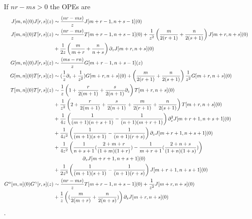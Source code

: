 \documentclass[11pt]{amsart}
\theoremstyle{thm}
\numberwithin{equation}{subsection}
\theoremstyle{def}
\theoremstyle{rem}
\begin{document}
If $nr-ms > 0$ the OPEs are
\begin{align}
J[m,n](0)J[r, s](z) &\sim {(nr-ms) \over z}J[m + r -1, n + s -1](0) \\
J[m, n](0)T[r, s](z) &\sim {(nr-ms) \over z}T[m + r -1, n + s -1](0) + {1 \over z^2}\left({m \over 2(r + 1)} + {n \over 2(s + 1)}\right)J[m + r, n + s](0) \\ \nonumber
&+{1 \over 2 z}\left({m \over m + r} + {n \over n + s} \right)\partial_z J[m + r, n + s](0)\\
G[m, n](0)J[r, s](z) &\sim {(ms - rn) \over z}G[m + r -1, n + s - 1](z) \\
G[m, n](0)T[r, s](z) &\sim ({1 \over z} \partial_z + {1 \over z^2})G[m + r, n+s](0) + \left({m \over 2(r+1)} + {n \over 2 (s + 1)}\right){1 \over z^2}G[m + r, n+s](0) \\
T[m, n](0)T[r, s](z) &\sim {1 \over z}\left(1 + {r \over 2(m+1)} + {s \over 2(n+1)}\partial_z \right) T[m + r, n +s](0) \\ \nonumber &+ {1 \over z^2}\left(2 + {r \over 2(m+1)} + {s \over 2(n+1)} + {m \over 2(r+1)} + {n \over 2(s+1)} \right)T[m + r, n + s](0)\\ \nonumber
&+{1 \over 4 z}\left({1 \over (m + 1)(n + s + 1)}- {1 \over (n +1)(m + r + 1)} \right) \partial^2_z J[m + r  +1, n + s +1](0) \\ \nonumber
&+{1 \over 4 z^2}\left({1 \over (m + 1)(s + 1)}- {1 \over (n+1)(r + s)}\right)\partial_z J[m + r + 1, n + s + 1](0) \\ \nonumber 
&+ {1 \over 4 z^2}\left({1 \over n + s + 1}({2 + m + r \over (1 + m)(1 + r)}) - {1 \over m + r + 1}({2 + n + s \over (1 + n)(1 + s)}) \right) \\ \nonumber & \ \ \ \ \ \ \ \ \ \ \ \ \ \ \ \ \ \partial_z J[m + r + 1, n + s + 1](0) \\ \nonumber
&+{1 \over 2 z^3}\left( {1 \over (m + 1)(s + 1)}- {1 \over (n+1)(r + s)}\right) J[m + r + 1, n + s + 1](0) \\ \nonumber
G^{\alpha}[m, n](0)G^{\gamma}[r, s](z) &\sim {(nr-ms) \over z}T[m + r -1, n + s -1](0) + {1 \over z^2}J[m + r, n + s](0) \\ \nonumber
&+{1 \over z}\left(({m \over 2 (m + r)} + {n \over 2 (n + s)})\right)\partial_z J[m + r, n+s](0)
\end{align}. 
\end{document}
